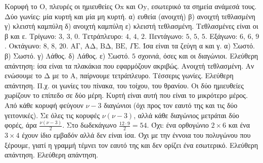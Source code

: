  Κορυφή το $\mathrm{Ο}$, πλευρές οι ημιευθείες $\mathrm{Οx}$ και $\mathrm{Οy}$, εσωτερικό τα σημεία ανάμεσά τους.
 Δύο γωνίες: μία κυρτή και μία μη κυρτή.
 α) ευθεία (ανοιχτή) \quad β) ανοιχτή τεθλασμένη \quad γ) κλειστή καμπύλη \quad δ) ανοιχτή καμπύλη \quad ε) κλειστή τεθλασμένη. Τεθλασμένες είναι οι β και ε.
 Τρίγωνο: $3,\,3,\,0$. Τετράπλευρο: $4,\,4,\,2$. Πεντάγωνο: $5,\,5,\,5$. Εξάγωνο: $6,\,6,\,9$. Οκτάγωνο: $8,\,8,\,20$.
 $\mathrm{ΑΓ}$, $\mathrm{ΑΔ}$, $\mathrm{ΒΔ}$, $\mathrm{ΒΕ}$, $\Gamma\mathrm{Ε}$.
 Ίσα είναι τα ζεύγη α και γ.
 α) Σωστό. β) Σωστό. γ) Λάθος. δ) Λάθος. ε) Σωστό.
 $5$ σχοινιά, όσες και οι διαγώνιοι.
 Ελεύθερη απάντηση: ίσα είναι τα πλακάκια που εφαρμόζουν ακριβώς.
 Ανοιχτή τεθλασμένη. Αν ενώσουμε το $\mathrm{Δ}$ με το $\mathrm{Α}$, παίρνουμε τετράπλευρο.
 Τέσσερις γωνίες.
 Ελεύθερη απάντηση. Π.χ. οι γωνίες του πίνακα, του τοίχου, του θρανίου.
 Οι δύο ημιευθείες χωρίζουν το επίπεδο σε δύο μέρη. Κυρτή είναι αυτή που είναι το μικρότερο μέρος.
 Από κάθε κορυφή φεύγουν $\nu-3$ διαγώνιοι (όχι προς τον εαυτό της και τις δύο γειτονικές). Σε όλες τις κορυφές $\nu(\nu-3)$, αλλά κάθε διαγώνιος μετράται δύο φορές, άρα $\frac{\nu(\nu-3)}{2}$. Στο δωδεκάγωνο $\frac{12\cdot9}{2}=54$.
 Όχι: ένα ορθογώνιο $2\times6$ και ένα $3\times4$ έχουν ίδιο εμβαδόν αλλά δεν είναι ίσα.
 Όχι με την έννοια του πολυγώνου που ξέρουμε, γιατί η γραμμή τέμνει τον εαυτό της και δεν ορίζει ένα εσωτερικό.
 Ελεύθερη απάντηση.
 Ελεύθερη απάντηση.
